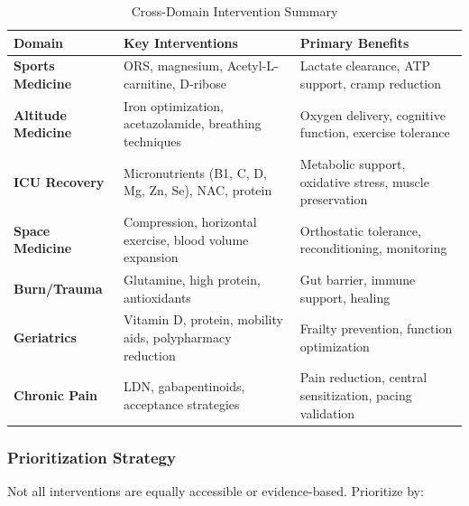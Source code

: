 \begin{table}[htbp]
\centering
\caption{Cross-Domain Intervention Summary}
\label{tab:cross-domain-summary}
\small
\begin{tabular}{p{3.5cm}p{4cm}p{6cm}}
\toprule
\textbf{Domain} & \textbf{Key Interventions} & \textbf{Primary Benefits} \\
\midrule
\textbf{Sports Medicine} & ORS, magnesium, Acetyl-L-carnitine, D-ribose & Lactate clearance, ATP support, cramp reduction \\
\textbf{Altitude Medicine} & Iron optimization, acetazolamide, breathing techniques & Oxygen delivery, cognitive function, exercise tolerance \\
\textbf{ICU Recovery} & Micronutrients (B1, C, D, Mg, Zn, Se), NAC, protein & Metabolic support, oxidative stress, muscle preservation \\
\textbf{Space Medicine} & Compression, horizontal exercise, blood volume expansion & Orthostatic tolerance, reconditioning, monitoring \\
\textbf{Burn/Trauma} & Glutamine, high protein, antioxidants & Gut barrier, immune support, healing \\
\textbf{Geriatrics} & Vitamin D, protein, mobility aids, polypharmacy reduction & Frailty prevention, function optimization \\
\textbf{Chronic Pain} & LDN, gabapentinoids, acceptance strategies & Pain reduction, central sensitization, pacing validation \\
\bottomrule
\end{tabular}
\end{table}

\subsubsection{Prioritization Strategy}

Not all interventions are equally accessible or evidence-based. Prioritize by:

